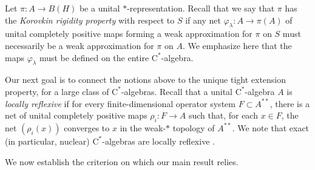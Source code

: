 \documentclass[10pt]{amsart}
\newcommand{\rC}{\mathrm{C}}
\renewcommand{\phi}{\varphi}
\theoremstyle{definition}
\begin{document}
Let $\pi:A\to B(H)$ be a unital $*$-representation. Recall that we say that $\pi$ has the \emph{Korovkin rigidity property} with respect to $S$ if any net $\phi_\lambda:A\to \pi(A)$
of unital completely positive maps forming a weak approximation for $\pi$ on $S$ must necessarily be a weak approximation for $\pi$ on $A$. We emphasize here that the maps $\phi_\lambda$ must be defined on the entire $\rC^*$-algebra.

Our next goal is to connect the notions above to the unique tight extension property, for a large class of $\rC^*$-algebras. Recall that a unital $\rC^*$-algebra $A$ is \emph{locally reflexive} if for every finite-dimensional operator system $F\subset A^{**}$, there is a net of unital completely positive maps $\rho_i:F\rightarrow A$ such that, for each $x\in F$, the net $(\rho_i(x))$ converges to $x$ in the weak-$*$ topology of $A^{**}$.  
We note that exact (in particular, nuclear) $\rC^*$-algebras are locally reflexive \cite[Corollary 9.4.1]{brown2008textrm}.


We now establish the criterion on which our  main result relies.
\end{document}
